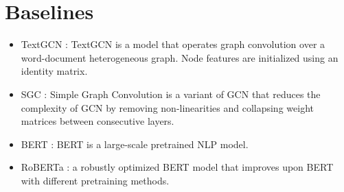 \documentclass[11pt,a4paper]{article}
\begin{document}
\section{Baselines}
\begin{itemize}[noitemsep]
  \item TextGCN \citep{yao2019graph}: TextGCN is a model that operates graph convolution over a word-document heterogeneous graph. Node features are initialized using an identity matrix.
  \item SGC \citep{wu2019simplifying}: Simple Graph Convolution is a variant of GCN that reduces the complexity of GCN by removing non-linearities and collapsing weight matrices between consecutive layers.
  \item BERT \citep{devlin2018bert}: BERT is a large-scale pretrained NLP model.
  \item RoBERTa \citep{yinhan2019roberta}: a robustly optimized BERT model that improves upon BERT with different pretraining methods.
\end{itemize}
\end{document}
